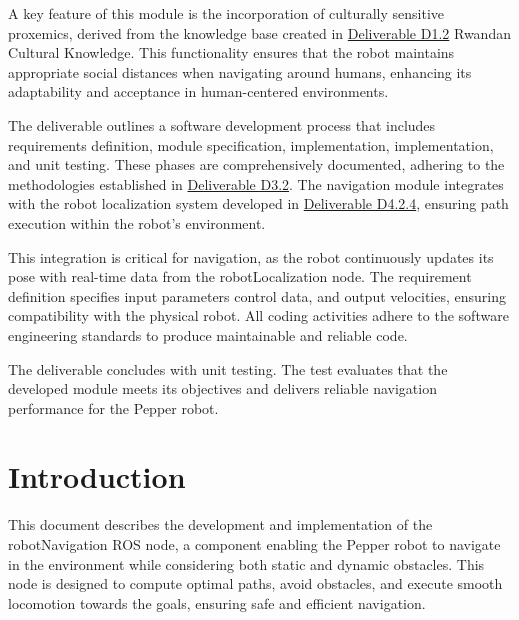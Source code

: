 \documentclass{CSSRforAfrica}
\begin{document}
\noindent A key feature of this module is the incorporation of culturally sensitive proxemics, derived from the knowledge base created in \href{https://cssr4africa.github.io/deliverables/CSSR4Africa_Deliverable_D1.2.pdf}{Deliverable D1.2} Rwandan Cultural Knowledge. This functionality ensures that the robot maintains appropriate social distances when navigating around humans, enhancing its adaptability and acceptance in human-centered environments.

\noindent The deliverable outlines a software development process that includes requirements definition, module specification, implementation, implementation, and unit testing. These phases are comprehensively documented, adhering to the methodologies established in \href{https://cssr4africa.github.io/deliverables/CSSR4Africa_Deliverable_D3.2.pdf}{Deliverable D3.2}. The navigation module integrates with the robot localization system developed in \href{https://cssr4africa.github.io/deliverables/CSSR4Africa_Deliverable_D4.2.4.pdf}{Deliverable D4.2.4}, ensuring path execution within the robot's environment.

\noindent This integration is critical for navigation, as the robot continuously updates its pose with real-time data from the robotLocalization node. The requirement definition specifies input parameters  control data, and output velocities, ensuring compatibility with the physical robot. All coding activities adhere to the software engineering standards to produce maintainable and reliable code.

\noindent The deliverable concludes with unit testing. The test evaluates that the developed module meets its objectives and delivers reliable navigation performance for the Pepper robot.


\newpage
\pagebreak
\tableofcontents
\newpage

\section{Introduction}
This document describes the development and implementation of the robotNavigation ROS node, a component enabling the Pepper robot to navigate in the environment while considering both static and dynamic obstacles. This node is designed to compute optimal paths, avoid obstacles, and execute smooth locomotion towards the goals, ensuring safe and efficient navigation. \\
\end{document}
